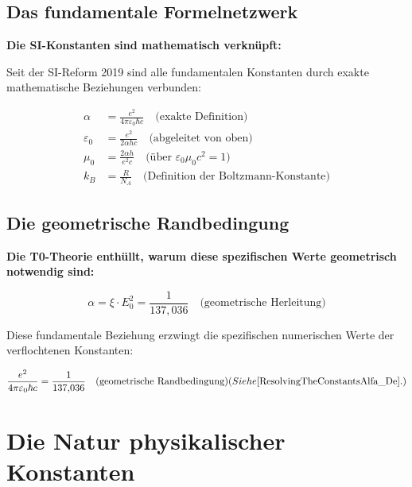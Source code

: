 	\subsection{Das fundamentale Formelnetzwerk}
	
	\begin{derivation}
		\textbf{Die SI-Konstanten sind mathematisch verknüpft:}
		
		Seit der SI-Reform 2019 sind alle fundamentalen Konstanten durch exakte mathematische Beziehungen verbunden:
		
		\begin{align}
			\alpha &= \frac{e^2}{4\pi\varepsilon_0\hbar c} \quad \text{(exakte Definition)} \\
			\varepsilon_0 &= \frac{e^2}{2\alpha h c} \quad \text{(abgeleitet von oben)} \\
			\mu_0 &= \frac{2\alpha h}{e^2 c} \quad \text{(über } \varepsilon_0\mu_0c^2 = 1) \\
			k_B &= \frac{R}{N_A} \quad \text{(Definition der Boltzmann-Konstante)}
		\end{align}
	\end{derivation}
	
	\subsection{Die geometrische Randbedingung}
	
	\begin{insight}
		\textbf{Die T0-Theorie enthüllt, warum diese spezifischen Werte geometrisch notwendig sind:}
		
		\begin{equation}
			\alpha = \xi \cdot E_0^2 = \frac{1}{137{,}036} \quad \text{(geometrische Herleitung)}
		\end{equation}
		
		Diese fundamentale Beziehung erzwingt die spezifischen numerischen Werte der verflochtenen Konstanten:
		
		\begin{equation}
			\frac{e^2}{4\pi\varepsilon_0\hbar c} = \frac{1}{137{,}036} \quad \text{(geometrische Randbedingung)} (Siehe \cite{ResolvingTheConstantsAlfa_De}.)
		\end{equation}
	\end{insight}
	
	\section{Die Natur physikalischer Konstanten}
	
